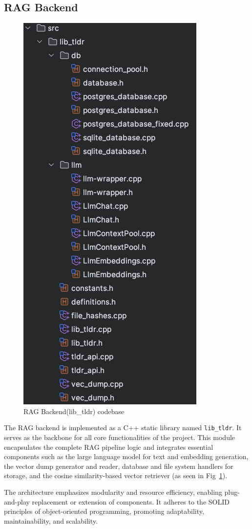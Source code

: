 \subsection{RAG Backend}
\label{subsec:AppDesignModules-RAG Backend}
\begin{figure}[htbp]
  \centering
  \includegraphics[width=0.5\linewidth]{images/lib_tldr_fs.png}
  \caption{RAG Backend(lib\_tldr) codebase}
  \label{fig:libTldrCodebase}
\end{figure}

The RAG backend is implemented as a C++ static library named \texttt{lib\_tldr}. It serves as the backbone for all core functionalities of the project. This module encapsulates the complete RAG pipeline logic and integrates essential components such as the large language model for text and embedding generation, the vector dump generator and reader, database and file system handlers for storage, and the cosine similarity-based vector retriever (as seen in Fig~\ref{fig:libTldrCodebase}).

The architecture emphasizes modularity and resource efficiency, enabling plug-and-play replacement or extension of components. It adheres to the SOLID principles of object-oriented programming, promoting adaptability, maintainability, and scalability.



